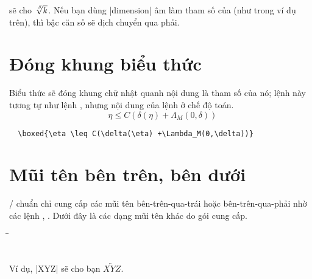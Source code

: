 \documentclass[11pt,leqno,titlepage,openany]{amsldoc}[1999/12/13]
\begin{document}
\medskip\noindent
sẽ cho $\sqrt[\leftroot{-2}\uproot{2}\beta]{k}$. Nếu bạn dùng |dimension|
âm làm tham số của  (như trong ví dụ trên),
thì bậc căn số sẽ dịch chuyển qua phải.

\section{Đóng khung biểu thức}

Biểu thức  sẽ đóng khung chữ nhật quanh nội dung là tham số của nó;
lệnh này tương tự như lệnh , nhưng nội dung của lệnh ở chế độ toán.
\begin{equation}
\boxed{\eta \leq C(\delta(\eta) +\Lambda_M(0,\delta))}
\end{equation}
\begin{verbatim}
  \boxed{\eta \leq C(\delta(\eta) +\Lambda_M(0,\delta))}
\end{verbatim}

\section{Mũi tên bên trên, bên dưới}

\latex/ chuẩn chỉ cung cấp các mũi tên bên-trên-qua-trái hoặc bên-trên-qua-phải
nhờ các lệnh , . Dưới đây là các dạng
mũi tên khác do gói  cung cấp.

\begin{tabbing}
\qquad\=\qquad\=\kill
\>     \>  \+\\
       \>  \\
   \> 
\end{tabbing}

Ví dụ, |{XYZ}| sẽ cho bạn $\overleftarrow{XYZ}$.
\end{document}
